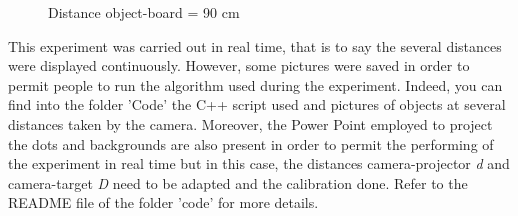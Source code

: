 \begin{figure}[!h] 
\centering
{}
\quad 
{}
\caption{Distance object-board = 90 cm}
\end{figure}


This experiment was carried out in real time, that is to say the several distances were displayed continuously. However, some pictures were saved in order to permit people to run the algorithm used during the experiment. Indeed, you can find into the folder 'Code' the C++ script used and pictures of objects at several distances taken by the camera. Moreover, the Power Point employed to project the dots and backgrounds are also present in order to permit the performing of the experiment in real time but in this case, the distances camera-projector \emph{d} and camera-target \emph{D} need to be adapted and the calibration done. Refer to the README file of the folder 'code' for more details.


